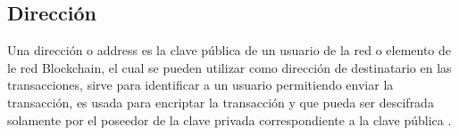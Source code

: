 \subsection{Dirección}
Una dirección o address  es la clave pública de un usuario de la red o elemento de le red Blockchain, el cual se pueden utilizar como
dirección de destinatario en las transacciones, sirve para identificar a un  usuario permitiendo enviar la transacción,
es usada para encriptar la transacción y que pueda ser descifrada solamente por el poseedor de la clave privada correspondiente a la clave pública \cite[]{drescher_Blockchain_2017}.